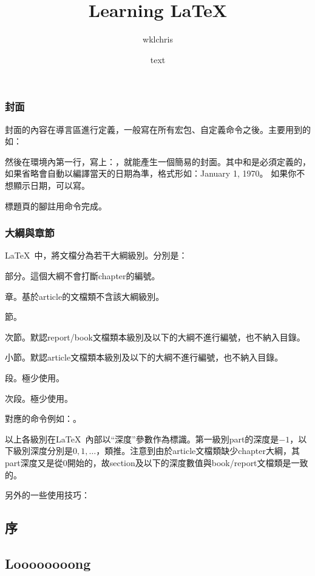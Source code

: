 \subsection{封面}
封面的內容在導言區進行定義，一般寫在所有宏包、自定義命令之後。主要用到的如：
\begin{latex}
\title{Learning LaTeX}
\author{wklchris}
\date{text}
\end{latex}

然後在環境內第一行，寫上：，就能產生一個簡易的封面。其中和是必須定義的，如果省略會自動以編譯當天的日期為準，格式形如：January 1, 1970。 如果你不想顯示日期，可以寫。

標題頁的腳註用命令完成。

\subsection{大綱與章節}
\LaTeX\ 中，將文檔分為若干大綱級別。分別是：
\begin{para}
\item[\latexline{part}] 部分。這個大綱不會打斷chapter的編號。
\item[\latexline{chapter}] 章。基於article的文檔類不含該大綱級別。
\item[\latexline{section}] 節。
\item[\latexline{subsection}] 次節。默認report/book文檔類本級別及以下的大綱不進行編號，也不納入目錄。
\item[\latexline{subsubsection}] 小節。默認article文檔類本級別及以下的大綱不進行編號，也不納入目錄。
\item[\latexline{paragraph}] 段。極少使用。
\item[\latexline{subparagraph}] 次段。極少使用。
\end{para}

對應的命令例如：。

以上各級別在\LaTeX\ 內部以“深度”參數作為標識。第一級別part的深度是$-1$，以下級別深度分別是$0,1,\ldots$，類推。注意到由於article文檔類缺少chapter大綱，其part深度又是從$0$開始的，故section及以下的深度數值與book/report文檔類是一致的。\dpar

另外的一些使用技巧：
\begin{latex}
\setcounter{tocdepth}{2}
\chapter*{序}
\section[Short]{Loooooooong}
\renewcommand{\chaptername}{CHAPTER}
\end{latex}

